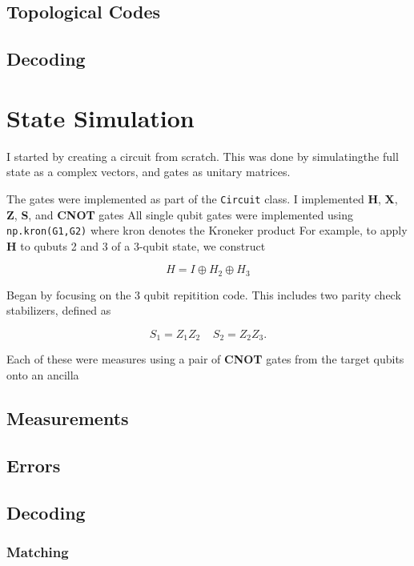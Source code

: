 \documentclass[a4paper,12pt]{article}
\begin{document}
\subsection{Topological Codes}
\subsection{Decoding}

\section{State Simulation}

I started by creating a circuit from scratch.
This was done by simulatingthe full state as a complex vectors, and gates as unitary matrices.

The gates were implemented as part of the \verb|Circuit| class.
I implemented \textbf{H}, \textbf{X}, \textbf{Z}, \textbf{S}, and \textbf{CNOT} gates
All single qubit gates were implemented using \verb|np.kron(G1,G2)| where kron denotes the Kroneker product
For example, to apply \textbf{H} to qubuts 2 and 3 of a 3-qubit state, we construct

\begin{equation}
    H = I \oplus H_2 \oplus H_3 
\end{equation}

Began by focusing on the 3 qubit repitition code. This includes two parity check stabilizers, defined as

\begin{equation}
    S_1 = Z_1 Z_2 \;\;\;\; S_2 = Z_2 Z_3.
\end{equation}

Each of these were measures using a pair of \textbf{CNOT} gates from the target qubits onto an ancilla

\subsection{Measurements}
\subsection{Errors}
\subsection{Decoding}
\subsubsection{Matching}
\end{document}
